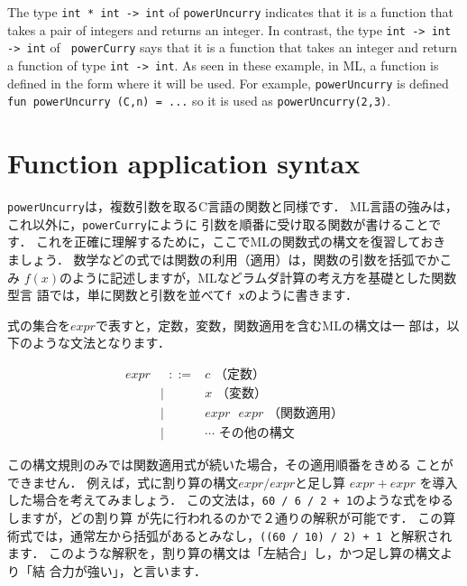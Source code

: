 \documentclass{jbook}
\newcommand{\txt}[2]{#2}
\newcommand{\myem}{\ \ \ \ \  }
\begin{document}
	The type {\tt int * int -> int} of {\tt powerUncurry} indicates
that it is a function that takes a pair of integers and returns an
integer.
	In contrast, the type {\tt int -> int -> int} of {\tt
powerCurry} says that it is a function that takes an integer and return
a function of type {\tt int -> int}.
	As seen in these example, in ML, a function is defined in the
form where it will be used.
	For example, {\tt powerUncurry} is defined {\tt fun powerUncurry
(C,n) = ...} so it is used as {\tt powerUncurry(2,3)}.
\fi%

\section{\txt{関数適用の文法}{Function application syntax}}
\label{sec:tutorialApplysyntax}

\ifx\jp%
	{\tt powerUncurry}は，複数引数を取るC言語の関数と同様です．
	ML言語の強みは，これ以外に，{\tt powerCurry}にように
引数を順番に受け取る関数が書けることです．
	これを正確に理解するために，ここでMLの関数式の構文を復習しておき
ましょう．
	数学などの式では関数の利用（適用）は，関数の引数を括弧でかこみ
$f(x)$のように記述しますが，MLなどラムダ計算の考え方を基礎とした関数型言
語では，単に関数と引数を並べて{\tt f x}のように書きます．

	式の集合を$expr$で表すと，定数，変数，関数適用を含むMLの構文は一
部は，以下のような文法となります．
\begin{tt}
\begin{eqnarray*}
expr &\mbox{\ \ }::=& c                  \mbox{\myem\myem （定数）} \\
     &|& x                    \mbox{\myem\myem （変数）} \\
     &|& expr\mbox{\ } expr   \mbox{\ （関数適用）} \\
     &|& \cdots               \mbox{\myem\myem その他の構文}
\end{eqnarray*}
\end{tt}

	この構文規則のみでは関数適用式が続いた場合，その適用順番をきめる
ことができません．
	例えば，式に割り算の構文$expr / expr$と足し算
$expr + expr$
を導入した場合を考えてみましょう．
	この文法は，{\tt 60 / 6 / 2 + 1}のような式をゆるしますが，どの割り算
が先に行われるのかで２通りの解釈が可能です．
	この算術式では，通常左から括弧があるとみなし，{\tt ((60 / 10) /
2) + 1 }と解釈されます．
	このような解釈を，割り算の構文は「左結合」し，かつ足し算の構文より「結
合力が強い」，と言います．
\end{document}
